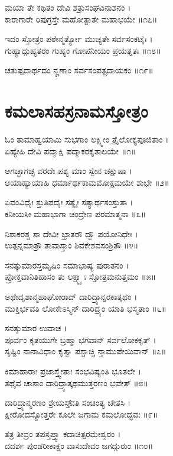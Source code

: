 ಮಯಾ ತೇ ಕಥಿತಂ ದೇವಿ ಶತ್ರುಸಂಘವಿನಾಶನಂ ।\\
ಕಾರಾಗಾರೇ ರಿಪುಗ್ರಸ್ತೇ ಮಹೋತ್ಪಾತೇ ಮಹಾಭಯೇ ॥೧೭॥

ಇದಂ ಸ್ತೋತ್ರಂ ಪಠೇನ್ಮರ್ತ್ಯೋ ಮುಚ್ಯತೇ ಸರ್ವಸಂಕಟೈಃ ।\\
ಗುಹ್ಯಾದ್ಗುಹ್ಯತರಂ ಗುಹ್ಯಂ ಗೋಪನೀಯಂ ಪ್ರಯತ್ನತಃ ॥೧೮॥

ಚತುಷ್ಪದಾರ್ಥದಂ ನೄಣಾಂ ಸರ್ವಸಂಪತ್ಪ್ರದಾಯಕಂ ॥೧೯॥


\section{ಕಮಲಾಸಹಸ್ರನಾಮಸ್ತೋತ್ರಂ}


ಓಂ ತಾಮಾಹ್ವಯಾಮಿ ಸುಭಗಾಂ ಲಕ್ಷ್ಮೀಂ ತ್ರೈಲೋಕ್ಯಪೂಜಿತಾಂ ।\\
ಏಹ್ಯೇಹಿ ದೇವಿ ಪದ್ಮಾಕ್ಷಿ ಪದ್ಮಾಕರಕೃತಾಲಯೇ ॥೧॥

ಆಗಚ್ಛಾಗಚ್ಛ ವರದೇ ಪಶ್ಯ ಮಾಂ ಸ್ವೇನ ಚಕ್ಷುಷಾ ।\\
ಆಯಾಹ್ಯಾಯಾಹಿ ಧರ್ಮಾರ್ಥಕಾಮಮೋಕ್ಷಮಯೇ ಶುಭೇ ॥೨॥

ಏವಂವಿಧೈಃ ಸ್ತುತಿಪದೈಃ ಸತ್ಯೈಃ ಸತ್ಯಾರ್ಥಸಂಸ್ತುತಾ ।\\
ಕನೀಯಸೀ ಮಹಾಭಾಗಾ ಚಂದ್ರೇಣ ಪರಮಾತ್ಮನಾ ॥೩॥

ನಿಶಾಕರಶ್ಚ ಸಾ ದೇವೀ ಭ್ರಾತರೌ ದ್ವೌ ಪಯೋನಿಧೇಃ ।\\
ಉತ್ಪನ್ನಮಾತ್ರೌ ತಾವಾಸ್ತಾಂ ಶಿವಕೇಶವಸಂಶ್ರಿತೌ ॥೪॥

ಸನತ್ಕುಮಾರಸ್ತಮೃಷಿಂ ಸಮಾಭಾಷ್ಯ ಪುರಾತನಂ ।\\
ಪ್ರೋಕ್ತವಾನಿತಿಹಾಸಂ ತು ಲಕ್ಷ್ಮ್ಯಾಃ ಸ್ತೋತ್ರಮನುತ್ತಮಂ ॥೫॥

ಅಥೇದೃಶಾನ್ಮಹಾಘೋರಾದ್ ದಾರಿದ್ರ್ಯಾನ್ನರಕಾತ್ಕಥಂ ।\\
ಮುಕ್ತಿರ್ಭವತಿ ಲೋಕೇಽಸ್ಮಿನ್ ದಾರಿದ್ರ್ಯಂ ಯಾತಿ ಭಸ್ಮತಾಂ ॥೬॥

ಸನತ್ಕುಮಾರ ಉವಾಚ ।\\
ಪೂರ್ವಂ ಕೃತಯುಗೇ ಬ್ರಹ್ಮಾ ಭಗವಾನ್ ಸರ್ವಲೋಕಕೃತ್ ।\\
ಸೃಷ್ಟಿಂ ನಾನಾವಿಧಾಂ ಕೃತ್ವಾ ಪಶ್ಚಾಚ್ಚಿ ನ್ತಾಮುಪೇಯಿವಾನ್ ॥೭॥

ಕಿಮಾಹಾರಾಃ ಪ್ರಜಾಸ್ತ್ವೇತಾಃ ಸಂಭವಿಷ್ಯಂತಿ ಭೂತಲೇ ।\\
ತಥೈವ ಚಾಸಾಂ ದಾರಿದ್ರ್ಯಾತ್ಕಥಮುತ್ತರಣಂ ಭವೇತ್ ॥೮॥

ದಾರಿದ್ರ್ಯಾನ್ಮರಣಂ ಶ್ರೇಯಸ್ತಿ್ವತಿ ಸಂಚಿಂತ್ಯ ಚೇತಸಿ ।\\
ಕ್ಷೀರೋದಸ್ಯೋತ್ತರೇ ಕೂಲೇ ಜಗಾಮ ಕಮಲೋದ್ಭವಃ ॥೯॥

ತತ್ರ ತೀವ್ರಂ ತಪಸ್ತಪ್ತ್ವಾ ಕದಾಚಿತ್ಪರಮೇಶ್ವರಂ ।\\
ದದರ್ಶ ಪುಂಡರೀಕಾಕ್ಷಂ ವಾಸುದೇವಂ ಜಗದ್ಗುರುಂ ॥೧೦॥

